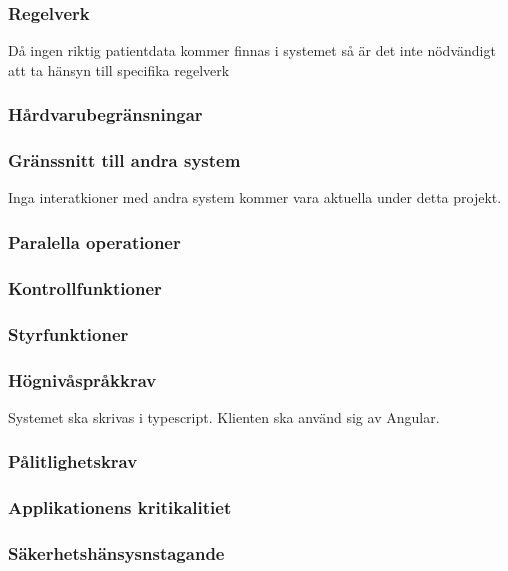 \documentclass{article}
\begin{document}
\begin{enumerate}
\subsubsection{Regelverk}
\label{subsec:Regelverk}
Då ingen riktig patientdata kommer finnas i systemet så är det inte nödvändigt
att ta hänsyn till specifika regelverk
\subsubsection{Hårdvarubegränsningar}
\label{subsec:Hardvarubegransningar}
\subsubsection{Gränssnitt till andra system}
\label{subsec:Granssnitt till andra system}
Inga interatkioner med andra system kommer vara aktuella under detta projekt.
\subsubsection{Paralella operationer}
\label{subsec:Paralella operationer}
\subsubsection{Kontrollfunktioner}
\label{subsec:Kontrollfunktioner}
\subsubsection{Styrfunktioner}
\label{subsec:Styrfunktioner}
\subsubsection{Högnivåspråkkrav}
\label{subsec:Hognivasprakkrav}
Systemet ska skrivas i typescript. Klienten ska använd sig av Angular.
\subsubsection{Pålitlighetskrav}
\label{subsec:Palitlighetskrav}
\subsubsection{Applikationens kritikalitiet}
\label{subsec:Applikationens kritikalitiet}
\subsubsection{Säkerhetshänsysnstagande}
\label{subsec:Sakerhetshansysnstagande}


\end{enumerate}
\end{document}
